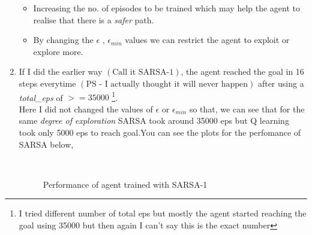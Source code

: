 \documentclass[journal,12pt,onecolumn]{IEEEtran}
\providecommand{\brak}[1]{\ensuremath{\left(#1\right)}}
\theoremstyle{remark}
\numberwithin{equation}{section}
\begin{document}
\begin{enumerate}
		          \begin{itemize}
				  \item Increasing the no. of episodes to be trained which may help the agent to realise that there is a \textit{safer} path.
				  \item By changing the $\epsilon$ , $\epsilon_{min}$ values we can restrict the agent to exploit or explore more.
			  \end{itemize}
		  \item If I did the earlier way $\brak{\text{Call it SARSA-1}}$, the agent reached the goal in 16 steps everytime $\brak{\text{PS - I actually thought it will never happen}}$ after using a \textit{total\_eps} of $>=35000$ \footnote{ I tried different number of total eps but mostly the agent started reaching the goal using 35000 but then again I can't say this is the exact number}. \\ Here I did not changed the values of $\epsilon$ or $\epsilon_{min}$ so that, we can see that for the same \textit{degree of exploration} SARSA took around 35000 eps but Q learning took only 5000 eps to reach goal.You can see the plots for the perfomance of SARSA below,

	      \begin{figure}[ht]%
                \centering
		\\
                \caption{Performance of agent trained with SARSA-1}%
                \label{sarsa-1}%
             \end{figure}
		

\end{enumerate}
\end{document}
